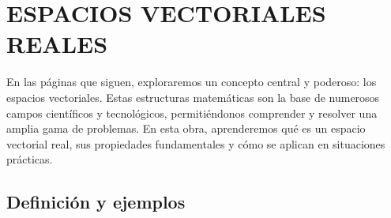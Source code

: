 \chapter[ESPACIOS VECTORIALES REALES]{ESPACIOS VECTORIALES \\ REALES}\label{chap:ev}
\printchaptertableofcontents

En las páginas que siguen, exploraremos un concepto central y poderoso: los espacios vectoriales. Estas estructuras matemáticas son la base de numerosos campos científicos y tecnológicos, permitiéndonos comprender y resolver una amplia gama de problemas. En esta obra, aprenderemos qué es un espacio vectorial real, sus propiedades fundamentales y cómo se aplican en situaciones prácticas.

\section{Definición y ejemplos}

